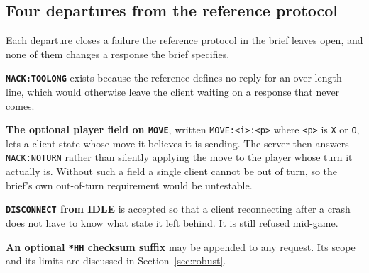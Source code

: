 \subsection{Four departures from the reference protocol}
Each departure closes a failure the reference protocol in the brief leaves
open, and none of them changes a response the brief specifies.

\textbf{\texttt{NACK:TOOLONG}} exists because the reference defines no reply
for an over-length line, which would otherwise leave the client waiting on a
response that never comes.

\textbf{The optional player field on \texttt{MOVE}}, written
\texttt{MOVE:<i>:<p>} where \texttt{<p>} is \texttt{X} or \texttt{O}, lets a
client state whose move it believes it is sending. The server then answers
\texttt{NACK:NOTURN} rather than silently applying the move to the player whose
turn it actually is. Without such a field a single client cannot be out of
turn, so the brief's own out-of-turn requirement would be untestable.

\textbf{\texttt{DISCONNECT} from IDLE} is accepted so that a client
reconnecting after a crash does not have to know what state it left behind. It
is still refused mid-game.

\textbf{An optional \texttt{*HH} checksum suffix} may be appended to any
request. Its scope and its limits are discussed in
Section~\ref{sec:robust}.
